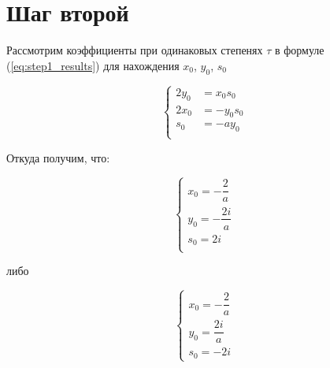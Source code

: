 \section{Шаг второй}

Рассмотрим коэффициенты при одинаковых степенях $ \tau $ в формуле (\ref{eq:step1_results}) для нахождения $ x_0 $, $ y_0 $, $ s_0 $

\begin{equation}
\label{eq:step2}
	\left\{
		\begin{aligned}
			2y_0 &= x_0 s_0 \\
            2x_0 &= -y_0 s_0 \\
            s_0 &= -ay_0 \\
		\end{aligned}
	\right.
\end{equation}

Откуда получим, что:

\begin{minipage}[h!]{0.4\linewidth}
\begin{equation*}
\label{eq:step2_a}
\left\{
\begin{aligned}
  x_0 = - \dfrac{2}{a} \\
  y_0 = -\dfrac{2i}{a} \\
  s_0 = 2i \\
\end{aligned}
\right.
\end{equation*}
\end{minipage}
\hfill
либо
\hfill
\begin{minipage}[h!]{0.4\linewidth}
\begin{equation*}
\label{eq:step2_b}
\left\{
\begin{aligned}
  x_0 = - \dfrac{2}{a} \\
  y_0 = \dfrac{2i}{a} \\
  s_0 = - 2i
\end{aligned}
\right.
\end{equation*}
\end{minipage}
